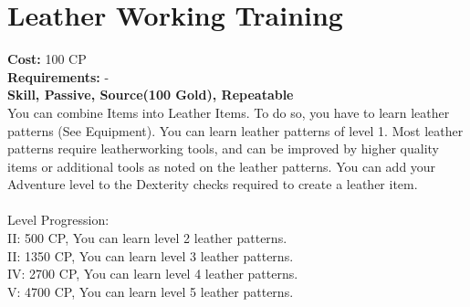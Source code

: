 \section{Leather Working Training}
\textbf{Cost:} 100 CP\\
\textbf{Requirements:} -\\
\textbf{Skill, Passive, Source(100 Gold), Repeatable}\\
You can combine Items into Leather Items. To do so, you have to learn leather patterns (See Equipment). You can learn leather patterns of level 1. Most leather patterns require leatherworking tools, and can be improved by higher quality items or additional tools as noted on the leather patterns. You can add your Adventure level to the Dexterity checks required to create a leather item.\\
\\
Level Progression:\\
II: 500 CP, You can learn level 2 leather patterns.\\
II: 1350 CP, You can learn level 3 leather patterns.\\
IV: 2700 CP, You can learn level 4 leather patterns.\\
V: 4700 CP, You can learn level 5 leather patterns.\\